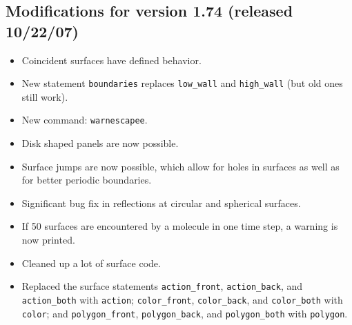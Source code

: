 \documentclass {scrbook}
\newcommand {\ttt} {\texttt}
\begin{document}
\subsection{Modifications for version 1.74 (released 10/22/07)}
\begin{itemize}
\item Coincident surfaces have defined behavior.
\item New statement \ttt{boundaries} replaces \ttt{low\_wall} and \ttt{high\_wall} (but old ones still work).
\item New command: \ttt{warnescapee}.
\item Disk shaped panels are now possible.
\item Surface jumps are now possible, which allow for holes in surfaces as well as for better periodic boundaries.
\item Significant bug fix in reflections at circular and spherical surfaces.
\item If 50 surfaces are encountered by a molecule in one time step, a warning is now printed.
\item Cleaned up a lot of surface code.
\item Replaced the surface statements \ttt{action\_front}, \ttt{action\_back}, and \ttt{action\_both} with \ttt{action}; \ttt{color\_front}, \ttt{color\_back}, and \ttt{color\_both} with \ttt{color}; and \ttt{polygon\_front}, \ttt{polygon\_back}, and \ttt{polygon\_both} with \ttt{polygon}.
\end{itemize}
\end{document}
